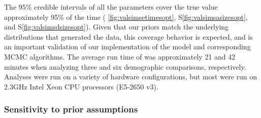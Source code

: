 The 95\% credible intervals of all the parameters
cover the true value approximately 95\% of the time
(\figs
\ref{fig:valsimsetimesopt},
S\ref{fig:valsimsasizesopt},
and
S\ref{fig:valsimsdsizesopt}).
Given that our priors match the underlying distributions that generated the
data, this coverage behavior is expected, and is an important validation
of our implementation of the model and corresponding MCMC algorithms.
The average run time of \ecoevolity was approximately 21 and 42 minutes
when analyzing three and six demographic comparisons, respectively.
Analyses were run on a variety of hardware configurations, but most were run on
2.3GHz Intel Xeon CPU processors (E5-2650 v3).


\subsubsection{Sensitivity to prior assumptions}

